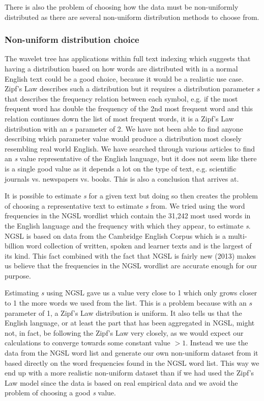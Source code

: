There is also the problem of choosing how the data must be non-uniformly distributed as there are several non-uniform distribution methods to choose from.

\subsubsection{Non-uniform distribution choice}
The wavelet tree has applications within full text indexing which suggests that having a distribution based on how words are distributed with in a normal English text could be a good choice, because it would be a realistic use case. 
Zipf's Law describes such a distribution \citep[abstract]{ZipfsLawOnText} but it requires a distribution parameter $s$ that describes the frequency relation between each symbol, e.g. if the most frequent word has double the frequency of the 2nd most frequent word and this relation continues down the list of most frequent words, it is a Zipf's Law distribution with an $s$ parameter of 2.
We have not been able to find anyone describing which parameter value would produce a distribution most closely resembling real world English. 
We have searched through various articles to find an \textit{s} value representative of the English language, but it does not seem like there is a single good value as it depends a lot on the type of text, e.g. scientific journals vs. newspapers vs. books.
This is also a conclusion that \citep[abstract]{ZipfsLawOnText} arrives at.

It is possible to estimate \textit{s} for a given text but doing so then creates the problem of choosing a representative text to estimate \textit{s} from.
We tried using the word frequencies in the NGSL \citep{NGSL} wordlist which contain the 31,242 most used words in the English language and the frequency with which they appear, to estimate \textit{s}.
NGSL is based on data from the Cambridge English Corpus which is a multi-billion word collection of written, spoken and learner texts and is the largest of its kind.
This fact combined with the fact that NGSL is fairly new (2013) makes us believe that the frequencies in the NGSL wordlist are accurate enough for our purpose.

Estimating \textit{s} using NGSL gave us a value very close to 1 which only grows closer to 1 the more words we used from the list.
This is a problem because with an $s$ parameter of 1, a Zipf's Law distribution is uniform.
It also tells us that the English language, or at least the part that has been aggregated in NGSL, might not, in fact, be following the Zipf's Law very closely, as we would expect our calculations to converge towards some constant value $>1$.
Instead we use the data from the NGSL word list and generate our own non-uniform dataset from it based directly on the word frequencies found in the NGSL word list.
This way we end up with a more realistic non-uniform dataset than if we had used the Zipf's Law model since the data is based on real empirical data and we avoid the problem of choosing a good \textit{s} value.


